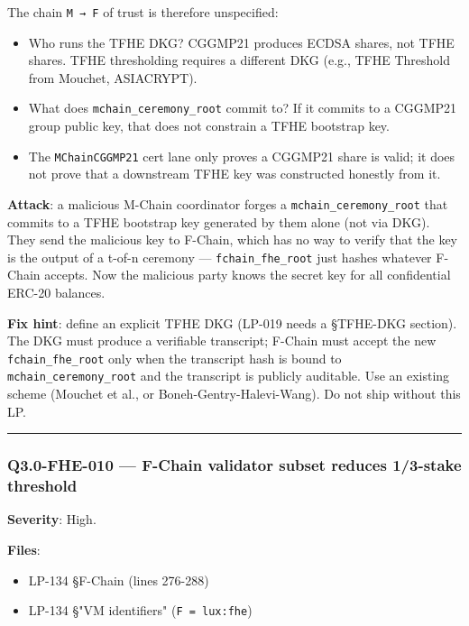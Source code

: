 \documentclass[
]{article}
\providecommand{\tightlist}{%
  \setlength{\itemsep}{0pt}\setlength{\parskip}{0pt}}
\begin{document}
The chain \texttt{M\ →\ F} of trust is therefore unspecified:

\begin{itemize}
\tightlist
\item
  Who runs the TFHE DKG? CGGMP21 produces ECDSA shares, not TFHE shares.
  TFHE thresholding requires a different DKG (e.g., TFHE Threshold from
  Mouchet, ASIACRYPT).
\item
  What does \texttt{mchain\_ceremony\_root} commit to? If it commits to
  a CGGMP21 group public key, that does not constrain a TFHE bootstrap
  key.
\item
  The \texttt{MChainCGGMP21} cert lane only proves a CGGMP21 share is
  valid; it does not prove that a downstream TFHE key was constructed
  honestly from it.
\end{itemize}

\textbf{Attack}: a malicious M-Chain coordinator forges a
\texttt{mchain\_ceremony\_root} that commits to a TFHE bootstrap key
generated by them alone (not via DKG). They send the malicious key to
F-Chain, which has no way to verify that the key is the output of a
t-of-n ceremony --- \texttt{fchain\_fhe\_root} just hashes whatever
F-Chain accepts. Now the malicious party knows the secret key for all
confidential ERC-20 balances.

\textbf{Fix hint}: define an explicit TFHE DKG (LP-019 needs a §TFHE-DKG
section). The DKG must produce a verifiable transcript; F-Chain must
accept the new \texttt{fchain\_fhe\_root} only when the transcript hash
is bound to \texttt{mchain\_ceremony\_root} and the transcript is
publicly auditable. Use an existing scheme (Mouchet et al., or
Boneh-Gentry-Halevi-Wang). Do not ship without this LP.

\begin{center}\rule{0.5\linewidth}{0.5pt}\end{center}

\subsubsection{Q3.0-FHE-010 --- F-Chain validator subset reduces
1/3-stake
threshold}\label{q30-fhe-010--f-chain-validator-subset-reduces-13-stake-threshold}

\textbf{Severity}: High.

\textbf{Files}:

\begin{itemize}
\tightlist
\item
  LP-134 §F-Chain (lines 276-288)
\item
  LP-134 §"VM identifiers" (\texttt{F\ =\ lux:fhe})
\end{itemize}
\end{document}
